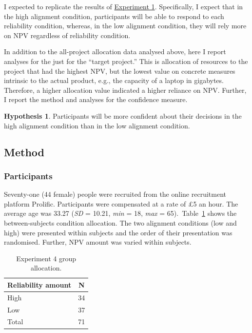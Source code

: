 \documentclass[a4paper, nobind, dvipsnames]{templates/ociamthesis}
\theoremstyle{definition}
\theoremstyle{definition}
\theoremstyle{definition}
\theoremstyle{definition}
\newtheorem{hypothesis}{Hypothesis}[chapter]
\theoremstyle{remark}
\begin{document}
I expected to replicate the results of \protect\hyperlink{results-alignment-2}{Experiment 1}.
Specifically, I expect that in the high alignment condition, participants will
be able to respond to each reliability condition, whereas, in the low alignment
condition, they will rely more on NPV regardless of reliability condition.

In addition to the all-project allocation data analysed above, here I report
analyses for the just for the ``target project.'' This is allocation of resources
to the project that had the highest NPV, but the lowest value on concrete
measures intrinsic to the actual product, e.g., the capacity of a laptop in
gigabytes. Therefore, a higher allocation value indicated a higher reliance on
NPV. Further, I report the method and analyses for the confidence measure.

\begin{hypothesis}
\protect\hypertarget{hyp:confidence-alignment-alignment-1}{}{\label{hyp:confidence-alignment-alignment-1} }Participants will be more confident about their decisions in the high alignment
condition than in the low alignment condition.
\end{hypothesis}

\hypertarget{method-alignment-1}{%
\subsection{Method}\label{method-alignment-1}}

\subsubsection{Participants}

Seventy-one (44 female) people were recruited from the online recruitment platform Prolific. Participants were compensated at a rate of £5 an hour. The average age was 33.27 (\emph{SD} = 10.21, \emph{min} = 18, \emph{max} = 65).~Table~\ref{tab:condition-allocation-alignment-1}
shows the between-subjects condition allocation. The two alignment conditions
(low and high) were presented within subjects and the order of their
presentation was randomised. Further, NPV amount was varied within subjects.

\begin{table}[tbp]

\begin{center}
\begin{threeparttable}

\caption{\label{tab:condition-allocation-alignment-1}Experiment 4 group allocation.}

\begin{tabular}{ll}
\toprule
Reliability amount & \multicolumn{1}{c}{N}\\
\midrule
High & 34\\
Low & 37\\
Total & 71\\
\bottomrule
\end{tabular}

\end{threeparttable}
\end{center}

\end{table}
\end{document}
